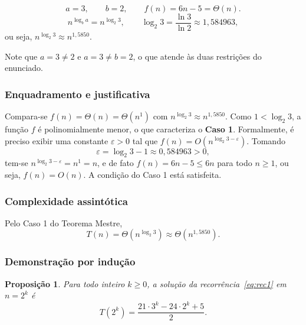 \documentclass[11pt,a4paper]{article}
\newtheorem{proposicao}{Proposição}
\begin{document}
\[
a=3,\qquad b=2,\qquad f(n)=6n-5=\Theta(n).
\]
\[
n^{\log_b a}=n^{\log_2 3},\qquad \log_2 3=\frac{\ln 3}{\ln 2}\approx1{,}584963,
\]
ou seja, $n^{\log_2 3}\approx n^{1{,}5850}$.

Note que $a=3\neq2$ e $a=3\neq b=2$, o que atende às duas restrições do enunciado.

\subsubsection{Enquadramento e justificativa}

Compara-se $f(n)=\Theta(n)=\Theta(n^1)$ com $n^{\log_2 3}\approx n^{1{,}5850}$. Como $1<\log_2 3$, a função $f$ é polinomialmente menor, o que caracteriza o \textbf{Caso 1}. Formalmente, é preciso exibir uma constante $\varepsilon>0$ tal que $f(n)=O\!\left(n^{\log_2 3-\varepsilon}\right)$. Tomando
\[
\varepsilon=\log_2 3-1\approx0{,}584963>0,
\]
tem-se $n^{\log_2 3-\varepsilon}=n^{1}=n$, e de fato $f(n)=6n-5\le 6n$ para todo $n\ge1$, ou seja, $f(n)=O(n)$. A condição do Caso 1 está satisfeita.

\subsubsection{Complexidade assintótica}

Pelo Caso 1 do Teorema Mestre,
\[
\boxed{T(n)=\Theta\!\left(n^{\log_2 3}\right)\approx\Theta\!\left(n^{1{,}5850}\right).}
\]

\subsubsection{Demonstração por indução}

\begin{proposicao}
\label{prop:p1}
Para todo inteiro $k\ge0$, a solução da recorrência~\eqref{eq:rec1} em $n=2^k$ é
\[
T(2^k)=\frac{21\cdot3^k-24\cdot2^k+5}{2}.
\]
\end{proposicao}
\end{document}
